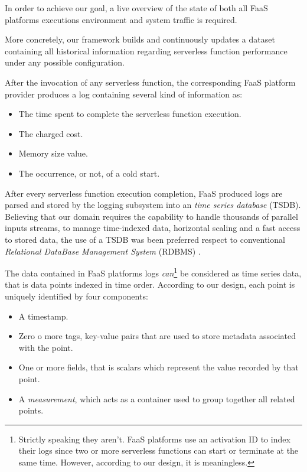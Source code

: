 \documentclass[12pt,a4paper]{report}
\begin{document}
In order to achieve our goal, a live overview of the state of both all FaaS platforms executions environment and system traffic is required.

More concretely, our framework builds and continuously updates a dataset containing all historical information regarding serverless function performance under any possible configuration.

After the invocation of any serverless function, the corresponding FaaS platform provider produces a log containing several kind of information as:   

\begin{itemize}
	\item The time spent to complete the serverless function execution.
	\item The charged cost.
	\item Memory size value.
	\item The occurrence, or not, of a cold start.
\end{itemize}

After every serverless function execution completion, FaaS produced logs are parsed and stored by the logging subsystem into an \textit{time series database} (TSDB). Believing that our domain requires the capability to handle thousands of parallel inputs streams, to manage time-indexed data, horizontal scaling and a fast access to stored data, the use of a TSDB was been preferred respect to conventional \textit{Relational DataBase Management System} (RDBMS) \cite{IOTTSDB}.  

The data contained in FaaS platforms logs \textit{can}\footnote{Strictly speaking they aren't. FaaS platforms use an activation ID to index their logs since two or more serverless functions can start or terminate at the same time. However, according to our design, it is meaningless.} be considered as time series data, that is data points indexed in time order. According to our design, each point is uniquely identified by four components:

\begin{itemize}
	\item A timestamp.
	
	\item Zero o more tags, key-value pairs that are used to store metadata associated with the point. 
	
	\item One or more fields, that is scalars which represent the value recorded by that point.
	
	\item A \textit{measurement}, which acts as a container used to group together all related points.
	
\end{itemize}
\end{document}
